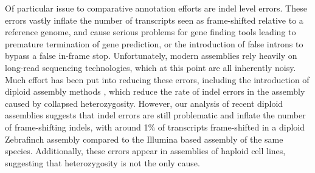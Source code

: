 \documentclass[fleqn,10pt]{wlscirep}
\begin{document}
Of particular issue to comparative annotation efforts are indel level errors. These errors vastly inflate the number of transcripts seen as frame-shifted relative to a reference genome, and cause serious problems for gene finding tools leading to premature termination of gene prediction, or the introduction of false introns to bypass a false in-frame stop. Unfortunately, modern assemblies rely heavily on long-read sequencing technologies, which at this point are all inherently noisy. Much effort has been put into reducing these errors, including the introduction of diploid assembly methods \cite{chin2016phased}, which reduce the rate of indel errors in the assembly caused by collapsed heterozygosity. However, our analysis of recent diploid assemblies suggests that indel errors are still problematic and inflate the number of frame-shifting indels, with around 1\% of transcripts frame-shifted in a diploid Zebrafinch assembly compared to the Illumina based assembly of the same species. Additionally, these errors appear in assemblies of haploid cell lines, suggesting that heterozygosity is not the only cause.
\end{document}
